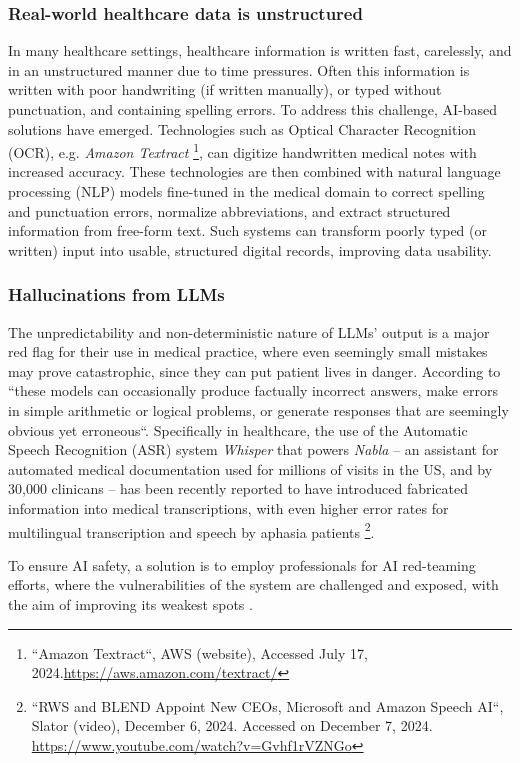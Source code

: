 \subsubsection{Real-world healthcare data is unstructured}
In many healthcare settings, healthcare information is written fast, carelessly, and in an unstructured manner due to time pressures. Often this information is written with poor handwriting (if written manually), or typed without punctuation, and containing spelling errors. To address this challenge, AI-based solutions have emerged. Technologies such as Optical Character Recognition (OCR), e.g. \textit{Amazon Textract} \footnote{``Amazon Textract``, AWS (website), Accessed July 17, 2024.\url{https://aws.amazon.com/textract/}}, can digitize handwritten medical notes with increased accuracy. These technologies are then combined with natural language processing (NLP) models fine-tuned in the medical domain to correct spelling and punctuation errors, normalize abbreviations, and extract structured information from free-form text. Such systems can transform poorly typed (or written) input into usable, structured digital records, improving data usability.

\subsubsection{Hallucinations from LLMs}\label{hallucsLLM}
The unpredictability and non-deterministic nature of LLMs’ output is a major red flag for their use in medical practice, where even seemingly small mistakes may prove catastrophic, since they can put patient lives in danger. According to \citeauthor{opportunitiesrisks2024} ``these models can occasionally produce factually incorrect answers, make errors in simple arithmetic or logical problems, or generate responses that are seemingly obvious yet erroneous``. Specifically in healthcare, the use of the Automatic Speech Recognition (ASR) system \textit{Whisper} that powers \textit{Nabla} -- an assistant for automated medical documentation used for millions of visits in the US, and by 30,000 clinicans -- has been recently reported to have introduced fabricated information into medical transcriptions, with even higher error rates for multilingual transcription and speech by aphasia patients \footnote{``RWS and BLEND Appoint New CEOs, Microsoft and Amazon Speech AI``, Slator (video), December 6, 2024. Accessed on December 7, 2024. \url{https://www.youtube.com/watch?v=Gvhf1rVZNGo}}.

To ensure AI safety, a solution is to employ professionals for AI red-teaming efforts, where the vulnerabilities of the system are challenged and exposed, with the aim of improving its weakest spots \cite{opportunitiesrisks2024}. 

